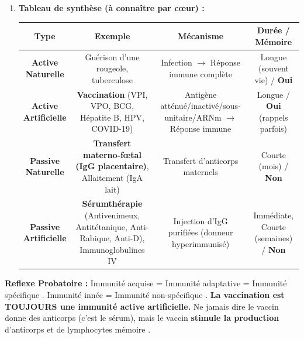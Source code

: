 \documentclass[11pt]{article}
\begin{document}
\begin{methode}
\begin{enumerate}
\begin{itemize}
        \end{itemize}
        \item \textbf{Tableau de synthèse (à connaître par cœur) :}
        \begin{center}
        \begin{tabular}{|c|c|c|c|}\hline
        \textbf{Type} & \textbf{Exemple} & \textbf{Mécanisme} & \textbf{Durée / Mémoire} \\ \hline
        \textbf{Active Naturelle} & Guérison d'une rougeole, tuberculose & Infection $\rightarrow$ Réponse immune complète & Longue (souvent vie) / \textbf{Oui} \\ \hline
        \textbf{Active Artificielle} & \textbf{Vaccination} (VPI, VPO, BCG, Hépatite B, HPV, COVID-19) & Antigène atténué/inactivé/sous-unitaire/ARNm $\rightarrow$ Réponse immune & Longue / \textbf{Oui} (rappels parfois) \\ \hline
        \textbf{Passive Naturelle} & \textbf{Transfert materno-fœtal (IgG placentaire)}, Allaitement (IgA lait) & Transfert d'anticorps maternels & Courte (mois) / \textbf{Non} \\ \hline
        \textbf{Passive Artificielle} & \textbf{Sérumthérapie} (Antivenimeux, Antitétanique, Anti-Rabique, Anti-D), Immunoglobulines IV & Injection d'IgG purifiées (donneur hyperimmunisé) & Immédiate, Courte (semaines) / \textbf{Non} \\ \hline
        \end{tabular}
        \end{center}
    \end{enumerate}
    \textbf{Reflexe Probatoire :} \og Immunité acquise \fg = \og Immunité adaptative \fg = \og Immunité spécifique \fg. \og Immunité innée \fg = \og Immunité non-spécifique \fg. \textbf{La vaccination est TOUJOURS une immunité active artificielle.} Ne jamais dire \og le vaccin donne des anticorps \fg (c'est le sérum), mais \og le vaccin \textbf{stimule la production} d'anticorps et de lymphocytes mémoire \fg.
\end{methode}
\end{document}

